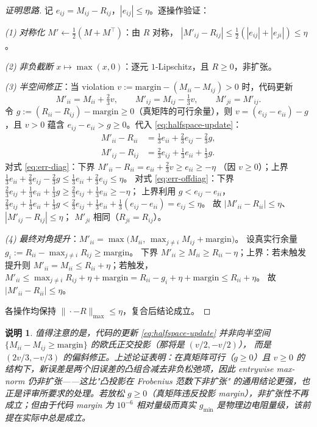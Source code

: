 \documentclass[UTF8,11pt]{ctexart}
\newtheorem{remark}{说明}
\begin{document}
\begin{proof}[证明思路]
记 $e_{ij}=M_{ij}-R_{ij}$，$|e_{ij}|\le\eta$。逐操作验证：

\emph{(1) 对称化} $M'\leftarrow\frac12(M+M^\top)$：由 $R$ 对称，
$|M'_{ij}-R_{ij}|\le\frac12(|e_{ij}|+|e_{ji}|)\le\eta$。

\emph{(2) 非负截断} $x\mapsto\max(x,0)$：逐元 $1$-Lipschitz，且 $R\ge 0$，非扩张。

\emph{(3) 半空间修正}：当 violation
$v:=\mathrm{margin}-(M_{ii}-M_{ij})>0$ 时，代码更新
\begin{equation}
  M'_{ii}=M_{ii}+\tfrac{2}{3}v,\qquad
  M'_{ij}=M_{ij}-\tfrac{1}{3}v,\qquad
  M'_{ji}=M'_{ij}.
  \label{eq:halfspace-update}
\end{equation}
令 $g:=(R_{ii}-R_{ij})-\mathrm{margin}\ge 0$（真矩阵的可行余量），则
$v=(e_{ij}-e_{ii})-g$，且 $v>0$ 蕴含 $e_{ij}-e_{ii}>g\ge 0$。代入
\eqref{eq:halfspace-update}：
\begin{align}
  M'_{ii}-R_{ii}
  &=\tfrac13 e_{ii}+\tfrac23 e_{ij}-\tfrac23 g,
  \label{eq:err-diag}\\
  M'_{ij}-R_{ij}
  &=\tfrac23 e_{ij}+\tfrac13 e_{ii}+\tfrac13 g.
  \label{eq:err-offdiag}
\end{align}
对式 \eqref{eq:err-diag}：下界 $M'_{ii}-R_{ii}=e_{ii}+\frac23v\ge e_{ii}\ge-\eta$
（因 $v\ge 0$）；上界 $\frac13e_{ii}+\frac23e_{ij}-\frac23g
\le\frac13e_{ii}+\frac23e_{ij}\le\eta$。
对式 \eqref{eq:err-offdiag}：下界
$\frac23e_{ij}+\frac13e_{ii}+\frac13g\ge\frac23e_{ij}+\frac13e_{ii}\ge-\eta$；
上界利用 $g<e_{ij}-e_{ii}$，
$\frac23e_{ij}+\frac13e_{ii}+\frac13g
<\frac23e_{ij}+\frac13e_{ii}+\frac13(e_{ij}-e_{ii})=e_{ij}\le\eta$。
故 $|M'_{ii}-R_{ii}|\le\eta$、$|M'_{ij}-R_{ij}|\le\eta$；
$M'_{ji}$ 相同（$R_{ji}=R_{ij}$）。

\emph{(4) 最终对角提升}：$M'_{ii}=\max\bigl(M_{ii},\,\max_{j\neq i}M_{ij}+\mathrm{margin}\bigr)$。
设真实行余量 $g_i:=R_{ii}-\max_{j\neq i}R_{ij}\ge\mathrm{margin}$。
下界 $M'_{ii}\ge M_{ii}\ge R_{ii}-\eta$；上界：若未触发提升则
$M'_{ii}=M_{ii}\le R_{ii}+\eta$；若触发，
$M'_{ii}\le \max_{j\neq i}R_{ij}+\eta+\mathrm{margin}
=R_{ii}-g_i+\eta+\mathrm{margin}\le R_{ii}+\eta$。
故 $|M'_{ii}-R_{ii}|\le\eta$。

各操作均保持 $\|\cdot-R\|_{\max}\le\eta$，复合后结论成立。
\end{proof}

\begin{remark}
值得注意的是，代码的更新 \eqref{eq:halfspace-update} 并非向半空间
$\{M_{ii}-M_{ij}\ge\mathrm{margin}\}$ 的欧氏正交投影（那将是 $(v/2,-v/2)$），
而是 $(2v/3,-v/3)$ 的偏斜修正。上述论证表明：在真矩阵可行（$g\ge 0$）且
$v\ge 0$ 的结构下，新误差是两个旧误差的凸组合减去非负松弛项，因此
\emph{entrywise max-norm} 仍非扩张——这比"凸投影在 Frobenius 范数下非扩张"
的通用结论更强，也正是评审所要求的处理。若放松 $g\ge 0$（真矩阵违反投影
margin），非扩张性不再成立；但由于代码 margin 为 $10^{-6}$ 相对量级而真实
$g_{\min}$ 是物理边电阻量级，该前提在实际中总是成立。
\end{remark}
\end{document}
